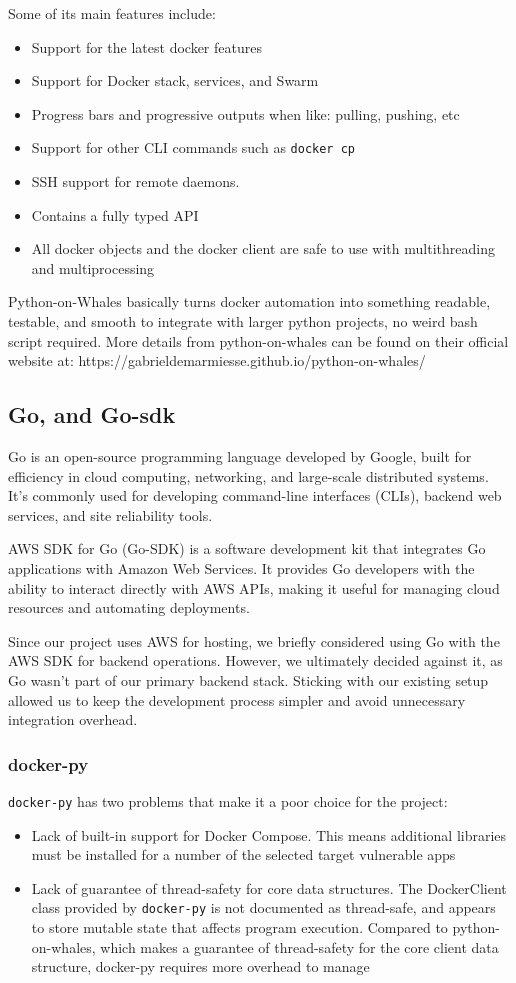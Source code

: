 \documentclass[12pt]{article}
\begin{document}
Some of its main features include:
\begin{itemize}
\item Support for the latest docker features
\item Support for Docker stack, services, and Swarm
\item Progress bars and progressive outputs when like: pulling, pushing, etc
\item Support for other CLI commands such as \texttt{docker cp}
\item SSH support for remote daemons.
\item Contains a fully typed API
\item All docker objects and the docker client are safe to use with multithreading and multiprocessing
\end{itemize}
Python-on-Whales basically turns docker automation into something readable, testable, and smooth to
integrate with larger python projects, no weird bash script required.
More details from python-on-whales can be found on their official website at: https://gabrieldemarmiesse.github.io/python-on-whales/

\subsection{Go, and Go-sdk}
Go is an open-source programming language developed by Google, built for efficiency in cloud computing, networking, and large-scale distributed systems.
It’s commonly used for developing command-line interfaces (CLIs), backend web services, and site reliability tools.

AWS SDK for Go (Go-SDK) is a software development kit that integrates Go applications with Amazon Web Services.
It provides Go developers with the ability to interact directly with AWS APIs, making it useful for managing cloud resources and automating deployments.

Since our project uses AWS for hosting, we briefly considered using Go with the AWS SDK for backend operations.
However, we ultimately decided against it, as Go wasn’t part of our primary backend stack.
Sticking with our existing setup allowed us to keep the development process simpler and avoid unnecessary integration overhead.

\subsubsection{docker-py}
\texttt{docker-py} has two problems that make it a poor choice for the project:
\begin{itemize}
	\item Lack of built-in support for Docker Compose. This means additional libraries must be installed for a number of the selected target vulnerable apps
	\item Lack of guarantee of thread-safety for core data structures. The DockerClient class provided by \texttt{docker-py} is not documented as thread-safe, and appears to store mutable state that affects program execution. Compared to python-on-whales, which makes a guarantee of thread-safety for the core client data structure, docker-py requires more overhead to manage
\end{itemize}
\end{document}
